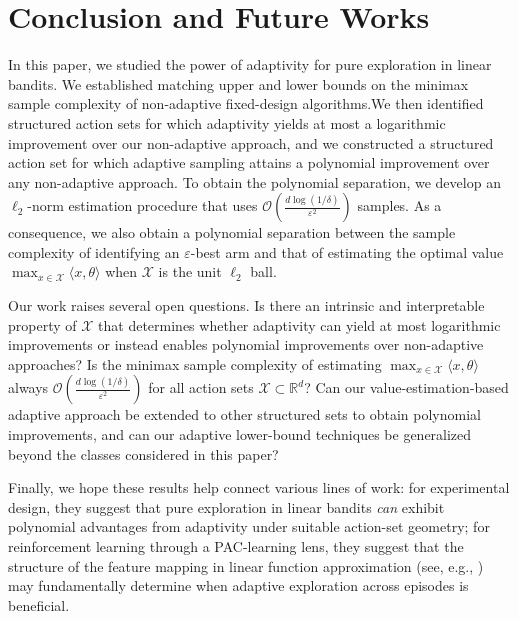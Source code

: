 \section{Conclusion and Future Works}
In this paper, we studied the power of adaptivity for pure exploration in linear bandits. We established matching upper and lower bounds on the minimax sample complexity of non-adaptive fixed-design algorithms.We then identified structured action sets for which adaptivity yields at most a logarithmic improvement over our non-adaptive approach, and we constructed a structured action set for which adaptive sampling attains a polynomial improvement over any non-adaptive approach. To obtain the polynomial separation, we develop an $\ell_2$-norm estimation procedure that uses $\mathcal{O}\!\left(\frac{d\log(1/\delta)}{\varepsilon^2}\right)$ samples. As a consequence, we also obtain a polynomial separation between the sample complexity of identifying an $\varepsilon$-best arm and that of estimating the optimal value $\max_{x\in\mathcal{X}}\langle x,\theta\rangle$ when $\mathcal{X}$ is the unit $\ell_2$ ball.

Our work raises several open questions. Is there an intrinsic and interpretable property of $\mathcal{X}$ that determines whether adaptivity can yield at most logarithmic improvements or instead enables polynomial improvements over non-adaptive approaches? Is the minimax sample complexity of estimating $\max_{x\in\mathcal{X}}\langle x,\theta\rangle$ always $\mathcal{O}\!\left(\frac{d\log(1/\delta)}{\varepsilon^2}\right)$ for all action sets $\mathcal{X}\subset \mathbb{R}^d$? Can our value-estimation-based adaptive approach be extended to other structured sets to obtain polynomial improvements, and can our adaptive lower-bound techniques be generalized beyond the classes considered in this paper? 

{Finally, we hope these results help connect various lines of work: for experimental design, they suggest that pure exploration in linear bandits \emph{can} exhibit polynomial advantages from adaptivity under suitable action-set geometry; for reinforcement learning through a PAC-learning lens, they suggest that the structure of the feature mapping in linear function approximation (see, e.g., \cite{bradtke1996linear,jin2020provably}) may fundamentally determine when adaptive exploration across episodes is beneficial.
}
